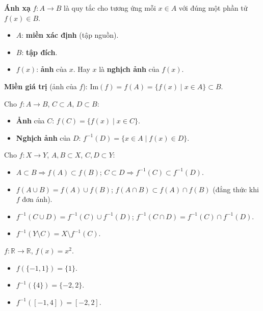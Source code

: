 \documentclass[12pt,a4paper]{article}
\begin{document}
\begin{dinhnghia}
  \textbf{Ánh xạ} $f: A \to B$ là quy tắc cho tương ứng mỗi $x \in A$ với đúng một phần tử $f(x) \in B$.
  \begin{itemize}
    \item $A$: \textbf{miền xác định} (tập nguồn).
    \item $B$: \textbf{tập đích}.
    \item $f(x)$: \textbf{ảnh} của $x$. Hay $x$ là \textbf{nghịch ảnh} của $f(x)$.
  \end{itemize}
\end{dinhnghia}

\begin{dinhnghia}
  \textbf{Miền giá trị} (ảnh của $f$): $\mathrm{Im}(f) = f(A) = \{f(x) \mid x \in A\} \subset B$.
\end{dinhnghia}

\begin{dinhnghia}
  Cho $f: A \to B$, $C \subset A$, $D \subset B$:
  \begin{itemize}
    \item \textbf{Ảnh} của $C$: $f(C) = \{f(x) \mid x \in C\}$.
    \item \textbf{Nghịch ảnh} của $D$: $f^{-1}(D) = \{x \in A \mid f(x) \in D\}$.
  \end{itemize}
\end{dinhnghia}

\begin{tinhchat}[title={Tính chất ảnh và nghịch ảnh}]
  Cho $f: X \to Y$, $A, B \subset X$, $C, D \subset Y$:
  \begin{itemize}
    \item $A \subset B \Rightarrow f(A) \subset f(B)$; \quad $C \subset D \Rightarrow f^{-1}(C) \subset f^{-1}(D)$.
    \item $f(A \cup B) = f(A) \cup f(B)$; \quad $f(A \cap B) \subset f(A) \cap f(B)$ (đẳng thức khi $f$ đơn ánh).
    \item $f^{-1}(C \cup D) = f^{-1}(C) \cup f^{-1}(D)$; \quad $f^{-1}(C \cap D) = f^{-1}(C) \cap f^{-1}(D)$.
    \item $f^{-1}(Y \setminus C) = X \setminus f^{-1}(C)$.
  \end{itemize}
\end{tinhchat}

\begin{vidu}
  $f: \mathbb{R} \to \mathbb{R}$, $f(x) = x^2$. 
  \begin{itemize}
      \item $f(\{-1, 1\}) = \{1\}$.
      \item $f^{-1}(\{4\}) = \{-2, 2\}$.
      \item $f^{-1}([-1, 4]) = [-2, 2]$.
  \end{itemize}
\end{vidu}
\end{document}
